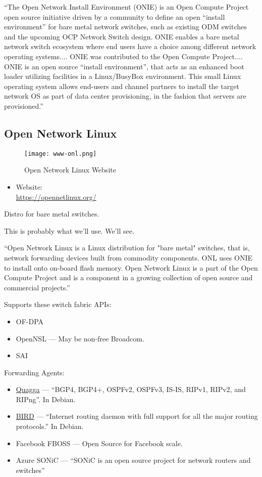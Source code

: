 ``The Open Network Install Environment (ONIE) is an Open Compute Project open source initiative driven by a community to define an open ``install environment'' for bare metal network switches, such as existing ODM switches and the upcoming OCP Network Switch design. ONIE enables a bare metal network switch ecosystem where end users have a choice among different network operating systems.... ONIE was contributed to the Open Compute Project.... ONIE is an open source ``install environment'', that acts as an enhanced boot loader utilizing facilities in a Linux/BusyBox environment. This small Linux operating system allows end-users and channel partners to install the target network OS as part of data center provisioning, in the fashion that servers are provisioned.''


\subsection{Open Network Linux}
\begin{figure}[h!]
\texttt{[image: www-onl.png]}
 \caption{Open Network Linux Website}
 \label{fig:www-onl}
\end{figure}


\begin{itemize}
 \item Website: \\ \url{https://opennetlinux.org/}
\end{itemize}


Distro for bare metal switches.


This is probably what we'll use. We'll see.


``Open Network Linux is a Linux distribution for "bare metal" switches, that is, network forwarding devices built from commodity components. ONL uses ONIE to install onto on-board flash memory. Open Network Linux is a part of the Open Compute Project and is a component in a growing collection of open source and commercial projects.''


Supports these switch fabric APIs:
\begin{itemize}
 \item OF-DPA
 \item OpenNSL --- May be non-free Broadcom.
 \item SAI
\end{itemize}


Forwarding Agents:
\begin{itemize}
 \item \href{http://www.quagga.net/}{Quagga} ---
       ``BGP4, BGP4+, OSPFv2, OSPFv3, IS-IS, RIPv1, RIPv2, and RIPng''. In Debian.
 \item \href{http://bird.network.cz/}{BIRD} ---
       ``Internet routing daemon with full support for all the major routing protocols.'' In Debian.
 \item Facebook FBOSS --- Open Source for Facebook scale.
 \item Azure SONiC --- ``SONiC is an open source project for network routers and switches''
\end{itemize}



